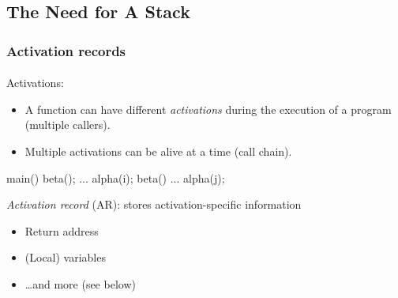\documentclass{beamer}
\begin{document}
\subsection{The Need for A Stack}
\begin{frame}[fragile]
\frametitle{Activation records}
\framesubtitle{}
Activations:
\begin{itemize}
\item A function can have different \textit{activations} during the
execution of a program (multiple callers).
\item Multiple activations
can be alive at a time (call chain).
\end{itemize}

\begin{cplus3}
    main()  {
         beta();
         ...
         alpha(i);
    }
    beta(){
         ... 
         alpha(j);
    }
\end{cplus3}



\bigskip

\textit{Activation record} (AR): stores activation-specific information
\begin{itemize}
\item Return address
\item (Local) variables
\item \ldots and more (see below)
\end{itemize}
\end{frame}
\end{document}
